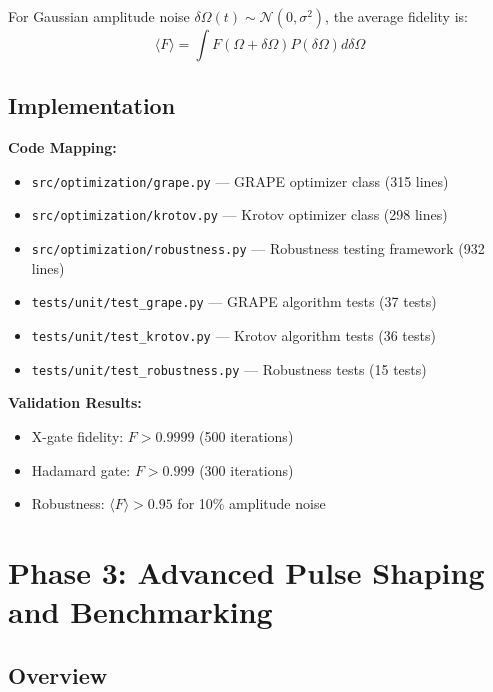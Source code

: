 \documentclass[11pt,a4paper]{article}
\theoremstyle{definition}
\theoremstyle{remark}
\begin{document}
For Gaussian amplitude noise $\delta\Omega(t) \sim \mathcal{N}(0, \sigma^2)$, the average fidelity is:
\begin{equation}
\langle F \rangle = \int F(\Omega + \delta\Omega) P(\delta\Omega) d\delta\Omega
\end{equation}

\subsection{Implementation}

\textbf{Code Mapping:}
\begin{itemize}
    \item \texttt{src/optimization/grape.py} — GRAPE optimizer class (315 lines)
    \item \texttt{src/optimization/krotov.py} — Krotov optimizer class (298 lines)
    \item \texttt{src/optimization/robustness.py} — Robustness testing framework (932 lines)
    \item \texttt{tests/unit/test\_grape.py} — GRAPE algorithm tests (37 tests)
    \item \texttt{tests/unit/test\_krotov.py} — Krotov algorithm tests (36 tests)
    \item \texttt{tests/unit/test\_robustness.py} — Robustness tests (15 tests)
\end{itemize}

\textbf{Validation Results:}
\begin{itemize}
    \item X-gate fidelity: $F > 0.9999$ (500 iterations)
    \item Hadamard gate: $F > 0.999$ (300 iterations)
    \item Robustness: $\langle F \rangle > 0.95$ for 10\% amplitude noise
\end{itemize}

\section{Phase 3: Advanced Pulse Shaping and Benchmarking}
\label{sec:phase3}

\subsection{Overview}
\end{document}
